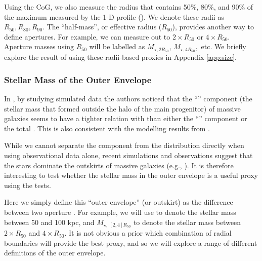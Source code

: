 \documentclass[fleqn,usenatbib,useAMS]{mnras}
\begin{document}
    Using the CoG, we also measure the radius that contains 50\%, 80\%, and 90\% of the maximum
    \mstar{} measured by the 1-D profile (\mmax{}).
    We denote these radii as $R_{50}, R_{80}, R_{90}$.
    The ``half-mass'', or effective radius ($R_{50}$), provides another way to define apertures.
    For example, we can measure \mstar{} out to $2\times R_{50}$ or $4\times R_{50}$. 
    Aperture masses using $R_{50}$ will be labelled as $M_{\star, 2R_{50}}$, $M_{\star, 4R_{50}},$
    etc. 
    We briefly explore the result of using these radii-based proxies in Appendix \ref{app:size}.

\subsubsection{Stellar Mass of the Outer Envelope}
    \label{sec:menvelope}

    In \citet{Bradshaw2020}, by studying simulated data the authors noticed that the ``\exsitu{}''
    component (the stellar mass that formed outside the halo of the main progenitor) of massive
    galaxies seems to have a tighter relation with \mvir{} than either the ``\insitu{}'' component
    or the total \mstar{}.
    This is also consistent with the modelling results from \citet{Huang2020}.

    While we cannot separate the \exsitu{} component from the \mstar{} distribution directly when
    using observational data alone, recent simulations and observations suggest that the \exsitu{}
    stars dominate the outskirts of massive galaxies (e.g., \citealt{Lackner2012,
    RodriguezGomez2016, Pulsoni2021}).
    It is therefore interesting to test whether the stellar mass in the outer envelope is a useful
    \mvir{} proxy using the \topn{} tests.

    Here we simply define this ``outer envelope'' (or outskirt) \mstar{} as the difference between
    two aperture \mstar{}.
    For example, we will use  to denote the stellar mass between 50 and 100 kpc, and
    $M_{\star,\ [2,4]R_{50}}$ to denote the stellar mass between $2 \times R_{50}$ and $4 \times
    R_{50}$. 
    It is not obvious a prior which combination of radial boundaries will provide the best
    \exsitu{} \mstar{} proxy, and so we will explore a range of different definitions of the outer
    envelope.
\end{document}
